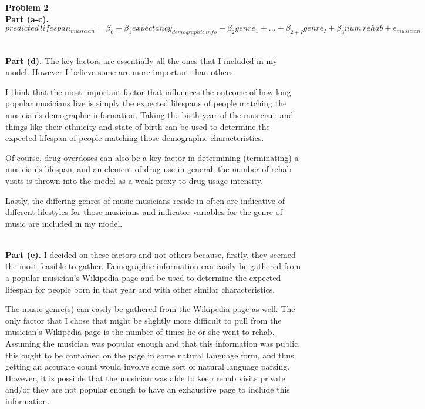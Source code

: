 \documentclass[letterpaper,12pt]{article}
\theoremstyle{definition}
\begin{document}
\noindent\textbf{Problem 2}
\\
\noindent\textbf{Part (a-c).}
$predicted\,lifespan_{musician} = \beta_{0} + \beta_{1}expectancy_{demographic \, info} + \beta_{2}genre_{1} + ... + \beta_{2+I}genre_{I} + \beta_{3}num\,rehab + \epsilon_{musician}$

\\
\noindent\textbf{Part (d).}
The key factors are essentially all the ones that I included in my model. However I believe some are more important than others.

I think that the most important factor that influences the outcome of how long popular musicians live is simply the expected lifespans of people matching the musician's demographic information. Taking the birth year of the musician, and things like their ethnicity and state of birth can be used to determine the expected lifespan of people matching those demographic characteristics.

Of course, drug overdoses can also be a key factor in determining (terminating) a musician's lifespan, and an element of drug use in general, the number of rehab visits is thrown into the model as a weak proxy to drug usage intensity.

Lastly, the differing genres of music musicians reside in often are indicative of different lifestyles for those musicians and indicator variables for the genre of music are included in my model.

\\
\noindent\textbf{Part (e).}
I decided on these factors and not others because, firstly, they seemed the most feasible to gather. Demographic information can easily be gathered from a popular musician's Wikipedia page and be used to determine the expected lifespan for people born in that year and with other similar characteristics. 

The music genre(s) can easily be gathered from the Wikipedia page as well. The only factor that I chose that might be slightly more difficult to pull from the musician's Wikipedia page is the number of times he or she went to rehab. Assuming the musician was popular enough and that this information was public, this ought to be contained on the page in some natural language form, and thus getting an accurate count would involve some sort of natural language parsing. However, it is possible that the musician was able to keep rehab visits private and/or they are not popular enough to have an exhaustive page to include this information.
\end{document}
